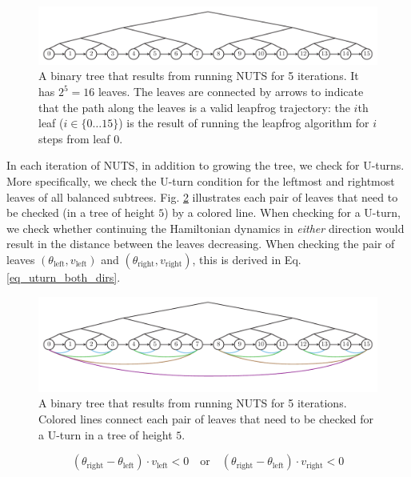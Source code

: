 \documentclass[12pt]{article}
\begin{document}
\begin{figure}[H]
\centering
\includegraphics[width=16cm]{illustrations/nuts_tree.pdf}
\caption{A binary tree that results from running NUTS for 5 iterations. It has $2^5 = 16$ leaves. The leaves are connected by arrows to indicate that the path along the leaves is a valid leapfrog trajectory: the $i$th leaf ($i \in \{0 \ldots 15\}$) is the result of running the leapfrog algorithm for $i$ steps from leaf $0$.}
\label{fig_nuts_tree}
\end{figure}

In each iteration of NUTS, in addition to growing the tree, we check for U-turns. More specifically, we check the U-turn condition for the leftmost and rightmost leaves of all balanced subtrees. Fig. \ref{fig_nuts_uturn_leaves} illustrates each pair of leaves that need to be checked (in a tree of height $5$) by a colored line. When checking for a U-turn, we check whether continuing the Hamiltonian dynamics in \textit{either} direction would result in the distance between the leaves decreasing. When checking the pair of leaves $(\theta_\text{left}, v_\text{left})$ and $(\theta_\text{right}, v_\text{right})$, this is derived in Eq. \ref{eq_uturn_both_dirs}.

\begin{figure}[H]
\centering
\includegraphics[width=16cm]{illustrations/nuts_uturn_leaves.pdf}
\caption{A binary tree that results from running NUTS for 5 iterations. Colored  lines connect each pair of leaves that need to be checked for a U-turn in a tree of height $5$.}
\label{fig_nuts_uturn_leaves}
\end{figure}

\begin{equation}
(\theta_\text{right} - \theta_\text{left}) \cdot v_\text{left} < 0
\quad \text{or} \quad
(\theta_\text{right} - \theta_\text{left}) \cdot v_\text{right} < 0
\label{eq_uturn_both_dirs}
\end{equation}
\end{document}
